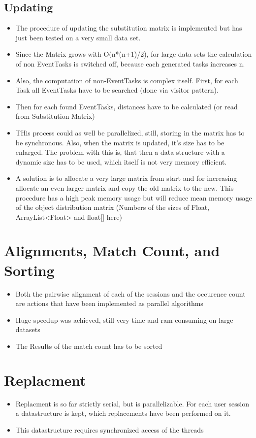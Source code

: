 \subsection{Updating}
\begin{itemize}
	\item The procedure of updating the substitution matrix is implemented but has just been tested on a very small data set. 
	\item Since the Matrix grows with O(n*(n+1)/2), for large data sets the calculation of non EventTasks is switched off, because each generated tasks increases n.
	\item Also, the computation of non-EventTasks is complex itself. First, for each Task all EventTasks have to be searched (done via visitor pattern). 
	\item Then for each found EventTasks, distances have to be calculated (or read from Substitution Matrix)
	\item THis process could as well be parallelized, still, storing in the matrix has to be synchronous. Also, when the matrix is updated, it's size has to be enlarged. The problem with this is, that then a data structure with a dynamic size has to be used, which itself is not very memory efficient. 
	\item A solution is to allocate a very large matrix from start and for increasing allocate an even larger matrix and copy the old matrix to the new. This procedure has a high peak memory usage but will reduce mean memory usage of the object distribution matrix (Numbers of the sizes of Float, ArrayList<Float> and float[] here)
\end{itemize}

\section{Alignments, Match Count, and Sorting}
\begin{itemize}
	\item Both the pairwise alignment of each of the sessions and the occurence count are actions that have been implemented as parallel algorithms
	\item Huge speedup was achieved, still very time and ram consuming on large datasets
	\item The Results of the match count has to be sorted
\end{itemize}

\section{Replacment}
\begin{itemize}
	\item Replacment is so far strictly serial, but is parallelizable. For each user session a datastructure is kept, which replacements have been performed on it. 
	\item This datastructure requires synchronized access of the threads
\end{itemize}

